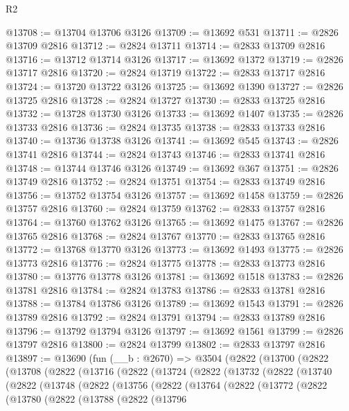 \begin{lexlean}{R2}
\begin{coremodule}
@13708 := @13704 @13706 @3126
@13709 := @13692 @531
@13711 := @2826 @13709 @2816
@13712 := @2824 @13711
@13714 := @2833 @13709 @2816
@13716 := @13712 @13714 @3126
@13717 := @13692 @1372
@13719 := @2826 @13717 @2816
@13720 := @2824 @13719
@13722 := @2833 @13717 @2816
@13724 := @13720 @13722 @3126
@13725 := @13692 @1390
@13727 := @2826 @13725 @2816
@13728 := @2824 @13727
@13730 := @2833 @13725 @2816
@13732 := @13728 @13730 @3126
@13733 := @13692 @1407
@13735 := @2826 @13733 @2816
@13736 := @2824 @13735
@13738 := @2833 @13733 @2816
@13740 := @13736 @13738 @3126
@13741 := @13692 @545
@13743 := @2826 @13741 @2816
@13744 := @2824 @13743
@13746 := @2833 @13741 @2816
@13748 := @13744 @13746 @3126
@13749 := @13692 @367
@13751 := @2826 @13749 @2816
@13752 := @2824 @13751
@13754 := @2833 @13749 @2816
@13756 := @13752 @13754 @3126
@13757 := @13692 @1458
@13759 := @2826 @13757 @2816
@13760 := @2824 @13759
@13762 := @2833 @13757 @2816
@13764 := @13760 @13762 @3126
@13765 := @13692 @1475
@13767 := @2826 @13765 @2816
@13768 := @2824 @13767
@13770 := @2833 @13765 @2816
@13772 := @13768 @13770 @3126
@13773 := @13692 @1493
@13775 := @2826 @13773 @2816
@13776 := @2824 @13775
@13778 := @2833 @13773 @2816
@13780 := @13776 @13778 @3126
@13781 := @13692 @1518
@13783 := @2826 @13781 @2816
@13784 := @2824 @13783
@13786 := @2833 @13781 @2816
@13788 := @13784 @13786 @3126
@13789 := @13692 @1543
@13791 := @2826 @13789 @2816
@13792 := @2824 @13791
@13794 := @2833 @13789 @2816
@13796 := @13792 @13794 @3126
@13797 := @13692 @1561
@13799 := @2826 @13797 @2816
@13800 := @2824 @13799
@13802 := @2833 @13797 @2816
@13897 := @13690
    (fun (__b : @2670) =>
    @3504
      (@2822
        (@13700
          (@2822
            (@13708
              (@2822
                (@13716
                  (@2822
                    (@13724
                      (@2822
                        (@13732
                          (@2822
                            (@13740
                              (@2822
                                (@13748
                                  (@2822
                                    (@13756
                                      (@2822
                                        (@13764
                                          (@2822
                                            (@13772
                                              (@2822
                                                (@13780
                                                  (@2822
                                                    (@13788
                                                      (@2822
                                                        (@13796

\end{coremodule}
\end{lexlean}
